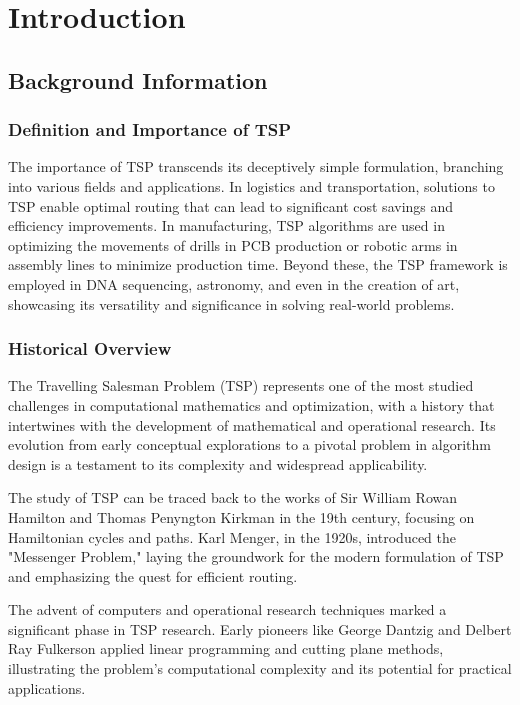 \chapter{Introduction}\label{chapt:1}
\label{introduction}

\section{Background Information}

\subsection{Definition and Importance of TSP}

The importance of TSP transcends its deceptively simple formulation, branching into various fields and applications. In logistics and transportation, solutions to TSP enable optimal routing that can lead to significant cost savings and efficiency improvements. In manufacturing, TSP algorithms are used in optimizing the movements of drills in PCB production or robotic arms in assembly lines to minimize production time. Beyond these, the TSP framework is employed in DNA sequencing, astronomy, and even in the creation of art, showcasing its versatility and significance in solving real-world problems.


\subsection{Historical Overview}

The Travelling Salesman Problem (TSP) represents one of the most studied challenges in computational mathematics and optimization, with a history that intertwines with the development of mathematical and operational research. Its evolution from early conceptual explorations to a pivotal problem in algorithm design is a testament to its complexity and widespread applicability.

The study of TSP can be traced back to the works of Sir William Rowan Hamilton and Thomas Penyngton Kirkman in the 19th century, focusing on Hamiltonian cycles and paths. Karl Menger, in the 1920s, introduced the "Messenger Problem," laying the groundwork for the modern formulation of TSP and emphasizing the quest for efficient routing.

The advent of computers and operational research techniques marked a significant phase in TSP research. Early pioneers like George Dantzig and Delbert Ray Fulkerson applied linear programming and cutting plane methods, illustrating the problem's computational complexity and its potential for practical applications.

